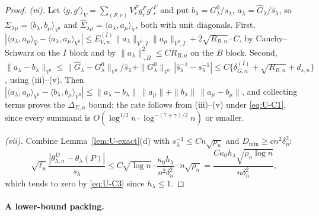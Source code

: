 \documentclass[11pt]{article}
\theoremstyle{definition}
\newcommand{\1}{\mathbf 1}\newcommand{\op}{\operatorname}
\begin{document}
\begin{proof}
\emph{(vi).}  Let $\langle g,g'\rangle_{V}=\sum_{(F,r)}V^F_rg^F_rg'^F_r$ and
put $b_\lambda=G_\lambda^0/s_\lambda$, $a_\lambda=\widehat G_\lambda/\widehat
s_\lambda$, so $\Sigma_{\lambda\mu}=\langle b_\lambda,b_\mu\rangle_{V^0}$ and
$\widehat\Sigma_{\lambda\mu}=\langle a_\lambda,a_\mu\rangle_{\widehat V}$, both
with unit diagonals.  First,
$|\langle a_\lambda,a_\mu\rangle_{\widehat V}
-\langle a_\lambda,a_\mu\rangle_{V^0}|
\le E^{(I)}_{V,n}\|a_\lambda\|_{V^0,I}\|a_\mu\|_{V^0,I}
+2\sqrt{R_{B,n}}\cdot C$, by Cauchy--Schwarz on the $I$ block and by
$\|a_\lambda\|^2_{\cdot,B}\le CR_{B,n}$ on the $B$ block.  Second,
$\|a_\lambda-b_\lambda\|_{V^0}
\le\|\widehat G_\lambda-G^0_\lambda\|_{V^0}/\widehat s_\lambda
+\|G^0_\lambda\|_{V^0}\,|\widehat s_\lambda^{-1}-s_\lambda^{-1}|
\le C\{\delta^{(I)}_{G,n}+\sqrt{R_{B,n}}+d_{s,n}\}$,
using (iii)--(v).  Then
$|\langle a_\lambda,a_\mu\rangle_{V^0}-\langle b_\lambda,b_\mu\rangle_{V^0}|
\le\|a_\lambda-b_\lambda\|\,\|a_\mu\|+\|b_\lambda\|\,\|a_\mu-b_\mu\|$, and
collecting terms proves the $\Delta_{\Sigma,n}$ bound; the rate follows from
(iii)--(v) under \eqref{eq:U-C1}, since every summand is
$O(\log^{1/2}n\cdot\log^{-(7+\gamma)/2}n)$ or smaller.

\emph{(vii).}  Combine Lemma~\ref{lem:U-exact}(d) with
$s_\lambda^{-1}\le Cn\sqrt{\rho_n}$ and $D_{\min}\ge cn^2\delta_n^2$:
\[
\sqrt{\ell_n}\,\frac{|\theta^D_{\lambda,n}-\theta_\lambda(P)|}{s_\lambda}
\le C\sqrt{\log n}\cdot\frac{\kappa_0h_\lambda}{n^2\delta_n^2}\cdot
n\sqrt{\rho_n}
=\frac{C\kappa_0h_\lambda\sqrt{\rho_n\log n}}{n\delta_n^2},
\]
which tends to zero by \eqref{eq:U-C3} since $h_\lambda\le1$.
\end{proof}

\paragraph{A lower-bound packing.}
\end{document}
